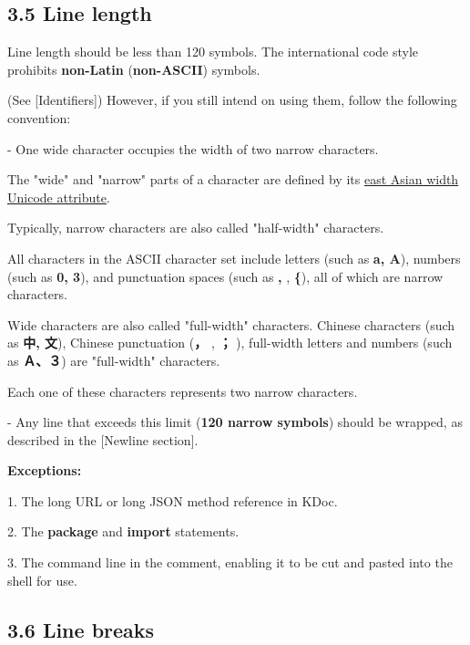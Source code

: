 \subsection*{\textbf{3.5 Line length}}

\label{sec:3.5}



Line length should be less than 120 symbols. The international code style prohibits \textbf{non-Latin} (\textbf{non-ASCII}) symbols.

(See [Identifiers]) However, if you still intend on using them, follow the following convention:



- One wide character occupies the width of two narrow characters.

The "wide" and "narrow" parts of a character are defined by its \href{https://unicode.org/reports/tr11/}{east Asian width Unicode attribute}.

Typically, narrow characters are also called "half-width" characters.

All characters in the ASCII character set include letters (such as \textbf{a, A}), numbers (such as \textbf{0, 3}), and punctuation spaces (such as \textbf{,} , \textbf{\{}), all of which are narrow characters.

Wide characters are also called "full-width" characters. Chinese characters (such as \textbf{中, 文}), Chinese punctuation (\textbf{，} , \textbf{；} ), full-width letters and numbers (such as \textbf{Ａ、３}) are "full-width" characters.

Each one of these characters represents two narrow characters.



- Any line that exceeds this limit (\textbf{120 narrow symbols}) should be wrapped, as described in the [Newline section]. 



\textbf{Exceptions:}



1.	The long URL or long JSON method reference in KDoc.

2.	The \textbf{package} and \textbf{import} statements.

3.	The command line in the comment, enabling it to be cut and pasted into the shell for use.



\subsection*{\textbf{3.6 Line breaks}}

